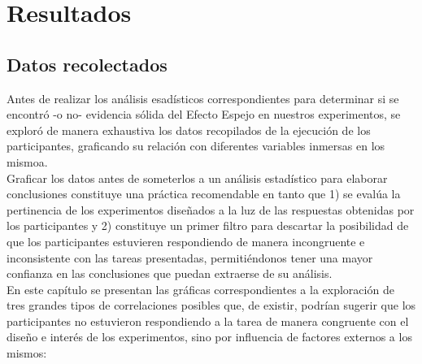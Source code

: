 
\chapter{Resultados} %
\label{Cap_Res} %



\section{Datos recolectados}

Antes de realizar los análisis esadísticos correspondientes para determinar si se encontró -o no- evidencia sólida del Efecto Espejo en nuestros experimentos, se exploró de manera exhaustiva los datos recopilados de la ejecución de los participantes, graficando su relación con diferentes variables inmersas en los mismoa.\\ 

Graficar los datos antes de someterlos a un análisis estadístico para elaborar conclusiones constituye una práctica recomendable en tanto que 1) se evalúa la pertinencia de los experimentos diseñados a la luz de las respuestas obtenidas por los participantes y 2) constituye un primer filtro para descartar la posibilidad de que los participantes estuvieren respondiendo de manera incongruente e inconsistente con las tareas presentadas, permitiéndonos tener una mayor confianza en las conclusiones que puedan extraerse de su análisis.\\

En este capítulo se presentan las gráficas correspondientes a la exploración de tres grandes tipos de correlaciones posibles que, de existir, podrían sugerir que los participantes no estuvieron respondiendo a la tarea de manera congruente con el diseño e interés de los experimentos, sino por influencia de factores externos a los mismos: 


